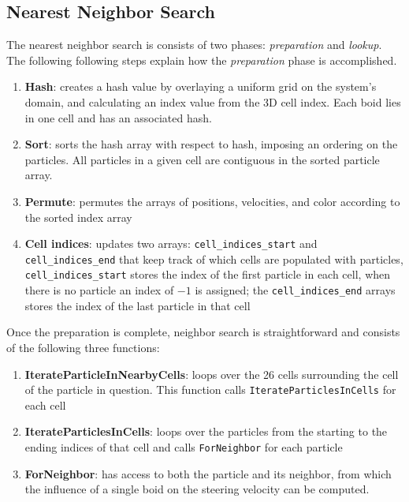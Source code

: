 \subsection{Nearest Neighbor Search}
 The nearest neighbor search 
is consists of two phases: \textit{preparation} and \textit{lookup}. 
The following following steps explain how the \textit{preparation} 
phase is accomplished.

\begin{enumerate}
\item{\textbf{Hash}: creates a hash value by overlaying a uniform grid on 
the system's domain, and calculating an index value from the 3D cell index. 
Each boid lies in one cell and has an associated hash.}
\item{\textbf{Sort}: sorts the hash array with respect to hash, imposing 
an ordering on the particles. All particles in a given cell are contiguous
in the sorted particle array.}
\item{\textbf{Permute}:  permutes the arrays of positions, velocities, and color according to the sorted index array}
\item{\textbf{Cell indices}: updates two arrays: \texttt{cell\_indices\_start} and \texttt{cell\_indices\_end} that keep track of which cells are populated with particles, \texttt{cell\_indices\_start} stores the index of the first particle in each cell, when there is no particle an index of $-1$ is assigned; the \texttt{cell\_indices\_end} arrays stores the index of the last particle in that cell}
\end{enumerate}

Once the preparation is complete, neighbor search is straightforward and consists of the following three functions:  
 

\begin{enumerate}
\item{\textbf{IterateParticleInNearbyCells}: loops over the 26 cells surrounding the cell of the particle in question. This function calls \texttt{IterateParticlesInCells} for each cell }
\item{\textbf{IterateParticlesInCells}: loops over the particles from the starting to the ending indices   of that cell and calls \texttt{ForNeighbor} for each particle}
\item{\textbf{ForNeighbor}: has access to both the particle and its neighbor, from which the influence of a single boid on the steering velocity can be computed.}
\end{enumerate}

